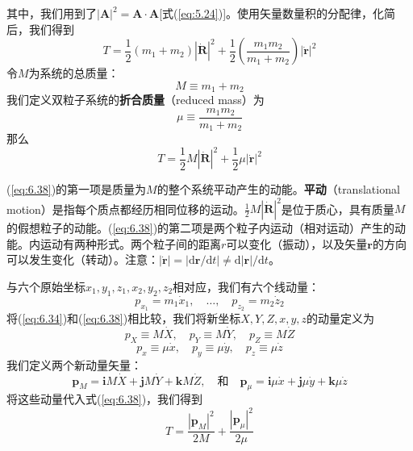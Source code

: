     其中，我们用到了$\left|\mathbf{A}\right|^2 = \mathbf{A}\cdot \mathbf{A}$[式(\ref{eq:5.24})]。使用矢量数量积的分配律，化简后，我们得到
    \begin{equation}
        T = \frac{1}{2}\left(m_1 + m_2\right)\left|\dot{\mathbf{R}}\right|^2 + \frac{1}{2}\left(\frac{m_1m_2}{m_1+m_2}\right)\left|\dot{\mathbf{r}}\right|^2
        \label{eq:6.35}
    \end{equation}
    令$M$为系统的总质量：
    \begin{equation}
        M \equiv m_1 + m_2
        \label{eq:6.36}
    \end{equation}
    我们定义双粒子系统的\textbf{折合质量}（reduced mass）为
    \begin{equation}
        \boxed{
            \mu \equiv \frac{m_1m_2}{m_1+m_2}
        }
        \label{eq:6.37}
    \end{equation}
    那么
    \begin{equation}
        T = \frac{1}{2}M\left|\dot{\mathbf{R}}\right|^2 + \frac{1}{2}\mu\left|\dot{\mathbf{r}}\right|^2
        \label{eq:6.38}
    \end{equation}

    (\ref{eq:6.38})的第一项是质量为$M$的整个系统平动产生的动能。\textbf{平动}（translational motion）是指每个质点都经历相同位移的运动。$\frac{1}{2}M\left|\dot{\mathbf{R}}\right|^2$是位于质心，具有质量$M$的假想粒子的动能。(\ref{eq:6.38})的第二项是两个粒子内运动（相对运动）产生的动能。内运动有两种形式。两个粒子间的距离$r$可以变化（振动），以及矢量$\mathbf{r}$的方向可以发生变化（转动）。注意：$\left|\dot{\mathbf{r}}\right| = \left|\mathrm{d}\mathbf{r}/\mathrm{d}t\right| \neq \mathrm{d}\left|\mathbf{r}\right|/\mathrm{d}t$。

    与六个原始坐标$x_1,y_1,z_1,x_2,y_2,z_2$相对应，我们有六个线动量：
    \begin{equation}
        p_{x_1} = m_1\dot{x}_1, \quad \ldots, \quad p_{z_2} = m_2\dot{z}_2
        \label{eq:6.39}
    \end{equation}
    将(\ref{eq:6.34})和(\ref{eq:6.38})相比较，我们将新坐标$X,Y,Z,x,y,z$的动量定义为
    \begin{equation*}
        p_X \equiv M\dot{X}, \quad p_Y \equiv M\dot{Y}, \quad p_Z \equiv M\dot{Z}
    \end{equation*}
    \begin{equation*}
        p_x \equiv \mu\dot{x}, \quad p_y \equiv \mu\dot{y}, \quad p_z \equiv \mu\dot{z}
    \end{equation*}
    我们定义两个新动量矢量：
    \begin{equation*}
        \mathbf{p}_M = \mathbf{i}M\dot{X} + \mathbf{j}M\dot{Y} + \mathbf{k}M\dot{Z},
        \quad \text{和} \quad \mathbf{p}_{\mu} = \mathbf{i}\mu\dot{x} + \mathbf{j}\mu\dot{y} + \mathbf{k}\mu\dot{z}
    \end{equation*}
    将这些动量代入式(\ref{eq:6.38})，我们得到
    \begin{equation}
        T = \frac{\left|\mathbf{p}_M\right|^2}{2M} + \frac{\left|\mathbf{p}_{\mu}\right|^2}{2\mu}
        \label{eq:6.40}
    \end{equation}

